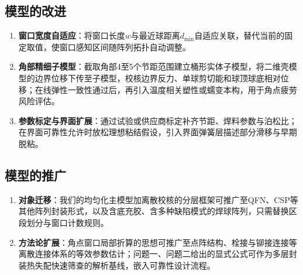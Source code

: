 \documentclass[draft,12pt,a4paper]{ctexart}
\theoremstyle{definition}
\begin{document}
\subsection{模型的改进}
\begin{enumerate}[itemsep=1pt]
  \item \textbf{窗口宽度自适应}：将窗口长度$w$与最近球距离$d_{\min}$自适应关联，替代当前的固定取值，使窗口感知区间随阵列拓扑自动调整。
  \item \textbf{角部精细子模型}：截取角部4至5个节距范围建立桶形实体子模型，将二维壳模型的边界位移下传至子模型，校核边界反力、单球剪切能和球顶球底相对位移；在线弹性一致性通过后，再引入温度相关塑性或蠕变本构，用于角点疲劳风险评估。
  \item \textbf{参数标定与界面扩展}：通过试验或供应商标定补齐节距、焊料参数与泊松比；在界面可靠性允许时放松理想粘结假设，引入界面弹簧层描述部分滑移与早期脱粘。
\end{enumerate}

\subsection{模型的推广}
\begin{enumerate}[itemsep=1pt]
  \item \textbf{对象迁移}：我们的均匀化主模型加离散校核的分层框架可推广至QFN、CSP等其他阵列封装形式，以及含底充胶、含多种缺陷模式的焊球阵列，只需替换区段划分与窗口计数规则。
  \item \textbf{方法论扩展}：角点窗口局部折算的思想可推广至点阵结构、栓接与铆接连接等离散连接体系的等效参数估计；问题一、问题二给出的显式公式可作为多层封装热失配快速筛查的解析基线，嵌入可靠性设计流程。
\end{enumerate}
\end{document}
